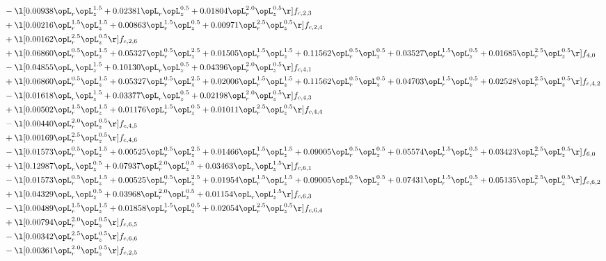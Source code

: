 \begin{alignat}{2}
& - \l[  0.00938 \opL_r \opL_z^{1.5} +  0.02381 \opL_r \opL_z^{0.5} +  0.01804 \opL_r^{2.0} \opL_z^{0.5}  \r] f_{c,2,3} \nonumber \\ 
& + \l[  0.00216 \opL_r^{1.5} \opL_z^{1.5} +  0.00863 \opL_r^{1.5} \opL_z^{0.5} +  0.00971 \opL_r^{2.5} \opL_z^{0.5}  \r] f_{c,2,4} \nonumber \\ 
& + \l[  0.00162 \opL_r^{2.5} \opL_z^{0.5}  \r] f_{c,2,6} \nonumber \\ 
& + \l[  0.06860 \opL_r^{0.5} \opL_z^{1.5} +  0.05327 \opL_r^{0.5} \opL_z^{2.5} +  0.01505 \opL_r^{1.5} \opL_z^{1.5} +  0.11562 \opL_r^{0.5} \opL_z^{0.5} +  0.03527 \opL_r^{1.5} \opL_z^{0.5} +  0.01685 \opL_r^{2.5} \opL_z^{0.5}  \r] f_{4,0} \nonumber \\ 
& - \l[  0.04855 \opL_r \opL_z^{1.5} +  0.10130 \opL_r \opL_z^{0.5} +  0.04396 \opL_r^{2.0} \opL_z^{0.5}  \r] f_{c,4,1} \nonumber \\ 
& + \l[  0.06860 \opL_r^{0.5} \opL_z^{1.5} +  0.05327 \opL_r^{0.5} \opL_z^{2.5} +  0.02006 \opL_r^{1.5} \opL_z^{1.5} +  0.11562 \opL_r^{0.5} \opL_z^{0.5} +  0.04703 \opL_r^{1.5} \opL_z^{0.5} +  0.02528 \opL_r^{2.5} \opL_z^{0.5}  \r] f_{c,4,2} \nonumber \\ 
& - \l[  0.01618 \opL_r \opL_z^{1.5} +  0.03377 \opL_r \opL_z^{0.5} +  0.02198 \opL_r^{2.0} \opL_z^{0.5}  \r] f_{c,4,3} \nonumber \\ 
& + \l[  0.00502 \opL_r^{1.5} \opL_z^{1.5} +  0.01176 \opL_r^{1.5} \opL_z^{0.5} +  0.01011 \opL_r^{2.5} \opL_z^{0.5}  \r] f_{c,4,4} \nonumber \\ 
& - \l[  0.00440 \opL_r^{2.0} \opL_z^{0.5}  \r] f_{c,4,5} \nonumber \\ 
& + \l[  0.00169 \opL_r^{2.5} \opL_z^{0.5}  \r] f_{c,4,6} \nonumber \\ 
& - \l[  0.01573 \opL_r^{0.5} \opL_z^{1.5} +  0.00525 \opL_r^{0.5} \opL_z^{2.5} +  0.01466 \opL_r^{1.5} \opL_z^{1.5} +  0.09005 \opL_r^{0.5} \opL_z^{0.5} +  0.05574 \opL_r^{1.5} \opL_z^{0.5} +  0.03423 \opL_r^{2.5} \opL_z^{0.5}  \r] f_{6,0} \nonumber \\ 
& + \l[  0.12987 \opL_r \opL_z^{0.5} +  0.07937 \opL_r^{2.0} \opL_z^{0.5} +  0.03463 \opL_r \opL_z^{1.5}  \r] f_{c,6,1} \nonumber \\ 
& - \l[  0.01573 \opL_r^{0.5} \opL_z^{1.5} +  0.00525 \opL_r^{0.5} \opL_z^{2.5} +  0.01954 \opL_r^{1.5} \opL_z^{1.5} +  0.09005 \opL_r^{0.5} \opL_z^{0.5} +  0.07431 \opL_r^{1.5} \opL_z^{0.5} +  0.05135 \opL_r^{2.5} \opL_z^{0.5}  \r] f_{c,6,2} \nonumber \\ 
& + \l[  0.04329 \opL_r \opL_z^{0.5} +  0.03968 \opL_r^{2.0} \opL_z^{0.5} +  0.01154 \opL_r \opL_z^{1.5}  \r] f_{c,6,3} \nonumber \\ 
& - \l[  0.00489 \opL_r^{1.5} \opL_z^{1.5} +  0.01858 \opL_r^{1.5} \opL_z^{0.5} +  0.02054 \opL_r^{2.5} \opL_z^{0.5}  \r] f_{c,6,4} \nonumber \\ 
& + \l[  0.00794 \opL_r^{2.0} \opL_z^{0.5}  \r] f_{c,6,5} \nonumber \\ 
& - \l[  0.00342 \opL_r^{2.5} \opL_z^{0.5}  \r] f_{c,6,6} \nonumber \\ 
& - \l[  0.00361 \opL_r^{2.0} \opL_z^{0.5}  \r] f_{c,2,5} \nonumber \\ 
\end{alignat} 


